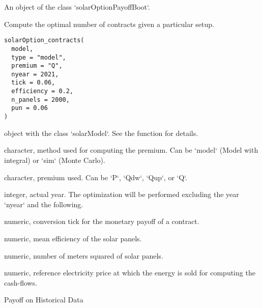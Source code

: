 \documentclass[a4paper]{book}
\begin{document}
%
\begin{Value}
An object of the class `solarOptionPayoffBoot`.
\end{Value}
%
\begin{Description}\relax
Compute the optimal number of contracts given a particular setup.
\end{Description}
%
\begin{Usage}
\begin{verbatim}
solarOption_contracts(
  model,
  type = "model",
  premium = "Q",
  nyear = 2021,
  tick = 0.06,
  efficiency = 0.2,
  n_panels = 2000,
  pun = 0.06
)
\end{verbatim}
\end{Usage}
%
\begin{Arguments}
\begin{ldescription}
\item[\code{model}] object with the class `solarModel`. See the function  for details.

\item[\code{type}] character, method used for computing the premium. Can be `model` (Model with integral) or `sim` (Monte Carlo).

\item[\code{premium}] character, premium used. Can be `P`, `Qdw`, `Qup`, or `Q`.

\item[\code{nyear}] integer, actual year. The optimization will be performed excluding the year `nyear` and the following.

\item[\code{tick}] numeric, conversion tick for the monetary payoff of a contract.

\item[\code{efficiency}] numeric, mean efficiency of the solar panels.

\item[\code{n\_panels}] numeric, number of meters squared of solar panels.

\item[\code{pun}] numeric, reference electricity price at which the energy is sold for computing the cash-flows.
\end{ldescription}
\end{Arguments}
%
\begin{Description}\relax
Payoff on Historical Data
\end{Description}
\end{document}
